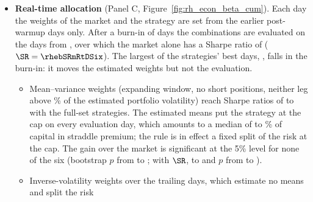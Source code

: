 \begin{itemize}
  \begin{itemize}
  \item In the tangency portfolio the strategy carries \rhebTanShareFullMin{} to \rhebTanShareFullMax\% of the
    volatility. The market's Sharpe ratio over the sample is low, so the in-sample optimum is almost the strategy
    alone; the strategy's leverage is arbitrary, so this share, not a dollar weight, is the allocation.
  \item The paired block bootstrap of the gain, with the weights re-estimated in each resample, gives $p$ from
    \rhebDSRmaxPFullMin{} to \rhebDSRmaxPFullMax{} (95\% intervals with lower ends from \rhebDSRmaxLoFullMin{} to
    \rhebDSRmaxLoFullMax). The gain cannot be negative, so this test rejects in one tail only and its $p$ lies below
    the GRS $p$: for the \rhebNHarDistinctWord{} distinct HAR-set forecasts it is below 5\% for
    \rhebBootSigHarWord{} and the GRS $p$ for none. The GRS test and the $t$-statistic of $\alpha$ are the tests of
    record.
  \end{itemize}
\item \textbf{Real-time allocation} (Panel C, Figure~\ref{fig:rh_econ_beta_cum}). Each day the weights of the market
  and the strategy are set from the earlier post-warmup days only. After a burn-in of \rhebNBurn{} days the
  combinations are evaluated on the \rhebNRt{} days from \rhebRtFirst, over which the market alone has a Sharpe ratio
  of \rhebSRmRt{} ($\SR = \rhebSRmRtDSix$). The largest of the strategies' best days, \rhebTopDate, falls in the
  burn-in: it moves the estimated weights but not the evaluation.
  \begin{itemize}
  \item Mean--variance weights (expanding window, no short positions, neither leg above \rhebCap\% of the estimated
    portfolio volatility) reach Sharpe ratios of \rhebRtMvFullMin{} to \rhebRtMvFullMax{} with the full-set
    strategies. The estimated means put the strategy at the cap on every evaluation day, which amounts to a median of
    \rhebRtMvWsFullMin{} to \rhebRtMvWsFullMax\% of capital in straddle premium; the rule is in effect a fixed split of
    the risk at the cap. The gain over the market is
    significant at the 5\% level for none of the six (bootstrap $p$ from \rhebRtMvPFullMin{} to
    \rhebRtMvPFullMax; with $\SR$, \rhebRtMvDSixFullMin{} to \rhebRtMvDSixFullMax{} and $p$ from
    \rhebRtMvDSixPFullMin{} to \rhebRtMvDSixPFullMax).
  \item Inverse-volatility weights over the trailing \rhebNTrail{} days, which estimate no means and split the risk

\end{itemize}
\end{itemize}
